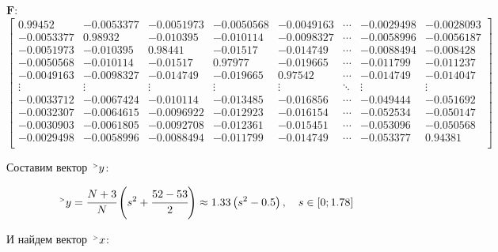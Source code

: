 \documentclass[a4paper, 14pt]{extarticle}
\begin{document}
\begin{center}
    $\textbf{F}:$ \\[1em]
    \begin{adjustbox}{max width=1\textwidth}
        \renewcommand{\arraystretch}{1}
    $\left[
        \begin{array}{cccccccccccccccccccc}
            0.99452 & -0.0053377 & -0.0051973 & -0.0050568 & -0.0049163 & \cdots & -0.0029498 & -0.0028093 \\
            -0.0053377 & 0.98932 & -0.010395 & -0.010114 & -0.0098327 & \cdots & -0.0058996 & -0.0056187 \\
            -0.0051973 & -0.010395 & 0.98441 & -0.01517 & -0.014749 & \cdots & -0.0088494 & -0.008428 \\
            -0.0050568 & -0.010114 & -0.01517 & 0.97977 & -0.019665 & \cdots & -0.011799 & -0.011237 \\
            -0.0049163 & -0.0098327 & -0.014749 & -0.019665 & 0.97542 & \cdots & -0.014749 & -0.014047 \\
            \vdots & \vdots & \vdots & \vdots & \vdots & \ddots & \vdots & \vdots \\
            -0.0033712 & -0.0067424 & -0.010114 & -0.013485 & -0.016856 & \cdots & -0.049444 & -0.051692 \\
            -0.0032307 & -0.0064615 & -0.0096922 & -0.012923 & -0.016154 & \cdots & -0.052534 & -0.050147 \\
            -0.0030903 & -0.0061805 & -0.0092708 & -0.012361 & -0.015451 & \cdots & -0.053096 & -0.050568 \\
            -0.0029498 & -0.0058996 & -0.0088494 & -0.011799 & -0.014749 & \cdots & -0.053377 & 0.94381 \\
        \end{array}
    \right]$
    \end{adjustbox}
\end{center}

\newpage

Составим вектор $\upgt y$:

\begin{equation*}
    \upgt y = \cfrac{N + 3}{N} \left(s^2 + \cfrac{52 - 53}{2} \right) \approx 
    1.33 \left( s^2 - 0.5 \right), \quad s \in \left[ 0; 1.78 \right]
\end{equation*}

\vspace{10pt}

И найдем вектор $\upgt x$:
\end{document}
